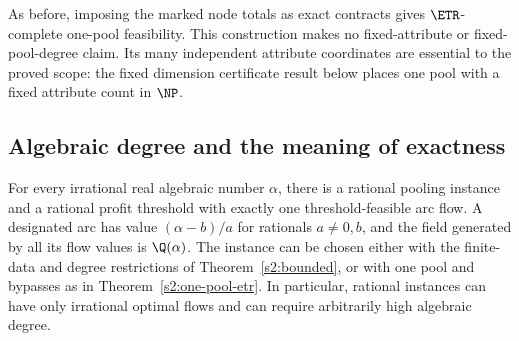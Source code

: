 As before, imposing the marked node totals as exact contracts gives
$\ETR$-complete one-pool feasibility. This construction makes no
fixed-attribute or fixed-pool-degree claim. Its many independent
attribute coordinates are essential to the proved scope: the fixed
dimension certificate result below places one pool with a fixed
attribute count in $\NP$.

\subsection{Algebraic degree and the meaning of exactness}\label{s2:degree}

\begin{theorem}\label{s2:algebraic-witness}
For every irrational real algebraic number $\alpha$, there is a rational
pooling instance and a rational profit threshold with exactly one
threshold-feasible arc flow. A designated arc has value
$(\alpha-b)/a$ for rationals $a\ne0,b$, and the field generated by
all its flow values is $\Q(\alpha)$. The instance can be chosen either
with the finite-data and degree restrictions of Theorem~\ref{s2:bounded},
or with one pool and bypasses as in Theorem~\ref{s2:one-pool-etr}.
In particular, rational instances can have only irrational optimal flows
and can require arbitrarily high algebraic degree.
\end{theorem}
